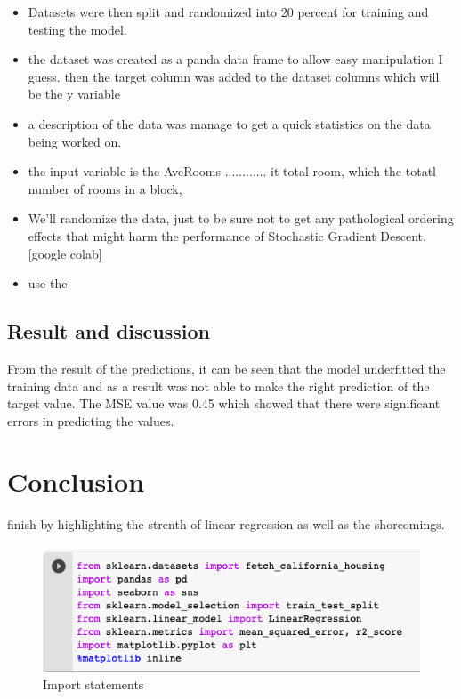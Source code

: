 \documentclass[conference]{IEEEtran}
\begin{document}
\begin{itemize}
\item Datasets were then split and randomized into 20 percent for training and testing the model.
\item the dataset was created as a panda data frame to allow easy manipulation I guess. then the target column was added to the dataset columns which will be the y variable
\item a description of the data was manage to get a quick statistics on the data being worked on.
\item the input variable is the AveRooms ............ it total-room, which the totatl number of rooms in a block,
\item We'll randomize the data, just to be sure not to get any pathological ordering effects that might harm the performance of Stochastic Gradient Descent.[google colab]
\item use the 
\end{itemize}

\subsection{Result and discussion}
From the result of the predictions, it can be seen that the model underfitted the training data and as a result was not able to make the right prediction of the target value. The MSE value was 0.45 which showed that there were significant errors in predicting the values.

\section{Conclusion}
finish by highlighting the strenth of linear regression as well as the shorcomings.

\newpage
\begin{figure}[htbp]
	\includegraphics [scale=0.5]{figures/import_statements.png}
	\caption{Import statements}
	\label{fig:placeholder}
\end{figure}
\end{document}
